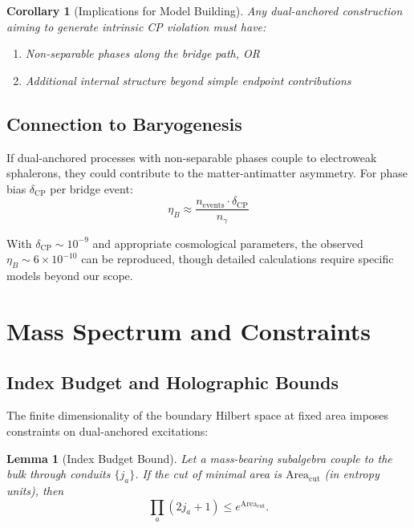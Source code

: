 \documentclass[11pt]{article}
\theoremstyle{plain}
\newtheorem{lemma}[theorem]{Lemma}
\newtheorem{corollary}[theorem]{Corollary}
\theoremstyle{definition}
\begin{document}
\begin{corollary}[Implications for Model Building]
  Any dual-anchored construction aiming to generate intrinsic CP violation must have:
  \begin{enumerate}
    \item Non-separable phases along the bridge path, OR
    \item Additional internal structure beyond simple endpoint contributions
  \end{enumerate}
\end{corollary}

\subsection{Connection to Baryogenesis}

If dual-anchored processes with non-separable phases couple to electroweak sphalerons, they could contribute to the matter-antimatter asymmetry. For phase bias $\delta_{\text{CP}}$ per bridge event:
\begin{equation}
  \eta_B \approx \frac{n_{\text{events}} \cdot \delta_{\text{CP}}}{n_\gamma}
\end{equation}

With $\delta_{\text{CP}} \sim 10^{-9}$ and appropriate cosmological parameters, the observed $\eta_B \sim 6\times 10^{-10}$ can be reproduced, though detailed calculations require specific models beyond our scope.

\section{Mass Spectrum and Constraints}
\label{sec:mass-spectrum}

\subsection{Index Budget and Holographic Bounds}

The finite dimensionality of the boundary Hilbert space at fixed area imposes constraints on dual-anchored excitations:

\begin{lemma}[Index Budget Bound]
  Let a mass-bearing subalgebra couple to the bulk through conduits $\{j_a\}$. If the cut of minimal area is $\mathrm{Area}_{\mathrm{cut}}$ (in entropy units), then
  \begin{equation}
    \prod_a (2j_a+1) \leq e^{\mathrm{Area}_{\mathrm{cut}}}.
  \end{equation}
\end{lemma}
\end{document}
